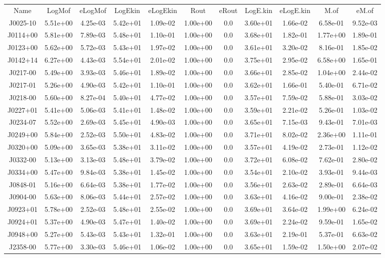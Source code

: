 \begin{table}
\begin{tabular}{ccccccccccc}
Name & LogMof & eLogMof & LogEkin & eLogEkin & Rout & eRout & LogE.kin & eLogE.kin & M.of & eM.of \\
J0025-10 & 5.51e+00 & 4.25e-03 & 5.42e+01 & 1.09e-02 & 1.00e+00 & 0.0 & 3.60e+01 & 1.66e-02 & 6.58e-01 & 9.52e-03 \\
J0114+00 & 5.81e+00 & 7.89e-03 & 5.48e+01 & 1.10e-01 & 1.00e+00 & 0.0 & 3.68e+01 & 1.82e-01 & 1.77e+00 & 1.89e-01 \\
J0123+00 & 5.62e+00 & 5.72e-03 & 5.43e+01 & 1.97e-02 & 1.00e+00 & 0.0 & 3.61e+01 & 3.20e-02 & 8.16e-01 & 1.85e-02 \\
J0142+14 & 6.27e+00 & 4.43e-03 & 5.54e+01 & 2.01e-02 & 1.00e+00 & 0.0 & 3.75e+01 & 2.95e-02 & 6.58e+00 & 1.65e-01 \\
J0217-00 & 5.49e+00 & 3.93e-03 & 5.46e+01 & 1.89e-02 & 1.00e+00 & 0.0 & 3.66e+01 & 2.85e-02 & 1.04e+00 & 2.44e-02 \\
J0217-01 & 5.26e+00 & 4.90e-03 & 5.42e+01 & 1.10e-01 & 1.00e+00 & 0.0 & 3.62e+01 & 1.66e-01 & 5.40e-01 & 6.71e-02 \\
J0218-00 & 5.60e+00 & 8.27e-04 & 5.40e+01 & 4.77e-02 & 1.00e+00 & 0.0 & 3.57e+01 & 7.59e-02 & 5.88e-01 & 3.03e-02 \\
J0227+01 & 5.41e+00 & 5.06e-03 & 5.41e+01 & 1.48e-02 & 1.00e+00 & 0.0 & 3.59e+01 & 2.21e-02 & 5.26e-01 & 1.03e-02 \\
J0234-07 & 5.52e+00 & 2.69e-03 & 5.45e+01 & 4.90e-03 & 1.00e+00 & 0.0 & 3.65e+01 & 7.15e-03 & 9.43e-01 & 7.01e-03 \\
J0249+00 & 5.84e+00 & 2.52e-03 & 5.50e+01 & 4.83e-02 & 1.00e+00 & 0.0 & 3.71e+01 & 8.02e-02 & 2.36e+00 & 1.11e-01 \\
J0320+00 & 5.09e+00 & 3.65e-03 & 5.38e+01 & 3.11e-02 & 1.00e+00 & 0.0 & 3.57e+01 & 4.19e-02 & 2.73e-01 & 1.12e-02 \\
J0332-00 & 5.13e+00 & 3.13e-03 & 5.48e+01 & 3.79e-02 & 1.00e+00 & 0.0 & 3.72e+01 & 6.08e-02 & 7.62e-01 & 2.80e-02 \\
J0334+00 & 5.47e+00 & 9.84e-03 & 5.38e+01 & 1.45e-02 & 1.00e+00 & 0.0 & 3.54e+01 & 2.10e-02 & 3.93e-01 & 9.44e-03 \\
J0848-01 & 5.16e+00 & 6.64e-03 & 5.38e+01 & 1.77e-02 & 1.00e+00 & 0.0 & 3.56e+01 & 2.63e-02 & 2.89e-01 & 6.64e-03 \\
J0904-00 & 5.63e+00 & 8.06e-03 & 5.44e+01 & 2.57e-02 & 1.00e+00 & 0.0 & 3.63e+01 & 4.16e-02 & 9.00e-01 & 2.38e-02 \\
J0923+01 & 5.78e+00 & 2.52e-03 & 5.48e+01 & 2.55e-02 & 1.00e+00 & 0.0 & 3.69e+01 & 3.64e-02 & 1.99e+00 & 6.24e-02 \\
J0924+01 & 5.37e+00 & 4.90e-03 & 5.47e+01 & 1.40e-02 & 1.00e+00 & 0.0 & 3.69e+01 & 2.24e-02 & 9.59e-01 & 1.65e-02 \\
J0948+00 & 5.27e+00 & 5.43e-03 & 5.43e+01 & 1.32e-01 & 1.00e+00 & 0.0 & 3.63e+01 & 2.19e-01 & 5.37e-01 & 6.63e-02 \\
J2358-00 & 5.77e+00 & 3.30e-03 & 5.46e+01 & 1.06e-02 & 1.00e+00 & 0.0 & 3.65e+01 & 1.59e-02 & 1.50e+00 & 2.07e-02 \\
\end{tabular}
\end{table}
